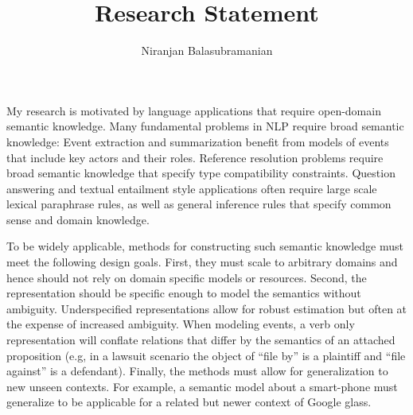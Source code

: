 \documentclass[a4paper,11pt,onecolumn]{article}
\newcommand{\eat}[1]{}
\begin{document}

\title{Research Statement}
\author{Niranjan Balasubramanian}
\maketitle

My research is motivated by language applications that require open-domain semantic knowledge. Many fundamental problems in NLP require broad semantic knowledge: Event extraction and summarization benefit from models of events that include key actors and their roles. Reference resolution problems require broad semantic knowledge that specify type compatibility constraints. Question answering and textual entailment style applications often require large scale lexical paraphrase rules, as well as general inference rules that specify common sense and domain knowledge.
 
To be widely applicable, methods for constructing such semantic knowledge must meet the following design goals. First, they must scale to arbitrary domains and hence should not rely on domain specific models or resources. Second, the representation should be specific enough to model the semantics without ambiguity. Underspecified representations allow for robust estimation but often at the expense of increased ambiguity. When modeling events, a verb only representation will conflate relations that differ by the semantics of an attached proposition (e.g, in a lawsuit scenario the object of ``file by'' is a plaintiff and ``file against'' is a defendant).\eat{Further, using a verb only representation (without prepositions) might provide robust models for more verbs but cover fewer relations.} Finally, the methods must allow for generalization to new unseen contexts. For example, a semantic model about a smart-phone must generalize to be applicable for a related but newer context of Google glass.
\end{document}
